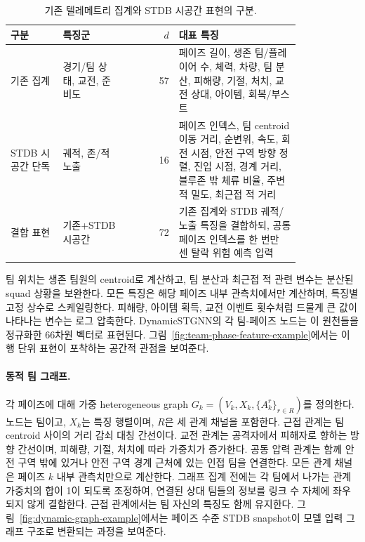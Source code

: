 \begin{table}[htbp]
\centering
\caption{기존 텔레메트리 집계와 STDB 시공간 표현의 구분.}
\label{tab:feature-sources}
\scriptsize
\setlength{\tabcolsep}{2.5pt}
\begin{tabular}{p{0.18\linewidth}p{0.22\linewidth}rp{0.42\linewidth}}
\toprule
구분 & 특징군 & \(d\) & 대표 특징 \\
\midrule
기존 집계 & 경기/팀 상태, 교전, 준비도 & 57 &
페이즈 길이, 생존 팀/플레이어 수, 체력, 차량, 팀 분산, 피해량, 기절,
처치, 교전 상대, 아이템, 회복/부스트 \\
STDB 시공간 단독 & 궤적, 존/적 노출 & 16 &
페이즈 인덱스, 팀 centroid 이동 거리, 순변위, 속도, 회전 시점, 안전 구역 방향 정렬,
진입 시점, 경계 거리, 블루존 밖 체류 비율, 주변 적 밀도, 최근접 적 거리 \\
결합 표현 & 기존+STDB 시공간 & 72 &
기존 집계와 STDB 궤적/노출 특징을 결합하되, 공통 페이즈 인덱스를 한 번만
센 탈락 위험 예측 입력 \\
\bottomrule
\end{tabular}
\end{table}

팀 위치는 생존 팀원의 centroid로 계산하고, 팀 분산과 최근접 적 관련
변수는 분산된 squad 상황을 보완한다. 모든 특징은 해당 페이즈 내부
관측치에서만 계산하며, 특징별 고정 상수로 스케일링한다. 피해량, 아이템
획득, 교전 이벤트 횟수처럼 드물게 큰 값이 나타나는 변수는 로그 압축한다.
DynamicSTGNN의 각 팀-페이즈 노드는 이 원천들을 정규화한 66차원 벡터로
표현된다.
그림~\ref{fig:team-phase-feature-example}에서는 이 행 단위 표현이 포착하는
공간적 관점을 보여준다.

\paragraph{동적 팀 그래프.}
각 페이즈에 대해 가중 heterogeneous graph
\(G_k=(V_k,X_k,\{A_k^r\}_{r\in R})\)를 정의한다. 노드는 팀이고,
\(X_k\)는 특징 행렬이며, \(R\)은 세 관계 채널을 포함한다. 근접
관계는 팀 centroid 사이의 거리 감쇠 대칭 간선이다. 교전 관계는
공격자에서 피해자로 향하는 방향 간선이며, 피해량, 기절, 처치에
따라 가중치가 증가한다. 공동 압력 관계는 함께 안전 구역 밖에 있거나
안전 구역 경계 근처에 있는 인접 팀을 연결한다. 모든 관계 채널은
페이즈 \(k\) 내부 관측치만으로 계산한다. 그래프 집계 전에는 각 팀에서
나가는 관계 가중치의 합이 1이 되도록 조정하여, 연결된 상대 팀들의
정보를 링크 수 자체에 좌우되지 않게 결합한다. 근접 관계에서는 팀
자신의 특징도 함께 유지한다. 그림~\ref{fig:dynamic-graph-example}에서는
페이즈 수준 STDB snapshot이 모델 입력 그래프 구조로 변환되는 과정을
보여준다.

